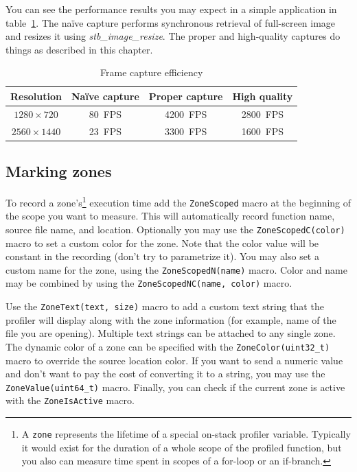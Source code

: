 \documentclass[hidelinks,titlepage,a4paper]{article}
\begin{document}
You can see the performance results you may expect in a simple application in table~\ref{asynccapture}. The na\"ive capture performs synchronous retrieval of full-screen image and resizes it using \emph{stb\_image\_resize}. The proper and high-quality captures do things as described in this chapter.

\begin{table}[h]
\centering
\begin{tabular}[h]{c|c|c|c}
\textbf{Resolution} & \textbf{Na\"ive capture} & \textbf{Proper capture} & \textbf{High quality} \\ \hline
$1280\times720$ & 80~FPS & 4200~FPS & 2800~FPS \\
$2560\times1440$ & 23~FPS & 3300~FPS & 1600~FPS
\end{tabular}
\caption{Frame capture efficiency}
\label{asynccapture}
\end{table}

\subsection{Marking zones}
\label{markingzones}

To record a zone's\footnote{A \texttt{zone} represents the lifetime of a special on-stack profiler variable. Typically it would exist for the duration of a whole scope of the profiled function, but you also can measure time spent in scopes of a for-loop or an if-branch.} execution time add the \texttt{ZoneScoped} macro at the beginning of the scope you want to measure. This will automatically record function name, source file name, and location. Optionally you may use the \texttt{ZoneScopedC(color)} macro to set a custom color for the zone. Note that the color value will be constant in the recording (don't try to parametrize it). You may also set a custom name for the zone, using the \texttt{ZoneScopedN(name)} macro. Color and name may be combined by using the \texttt{ZoneScopedNC(name, color)} macro.

Use the \texttt{ZoneText(text, size)} macro to add a custom text string that the profiler will display along with the zone information (for example, name of the file you are opening). Multiple text strings can be attached to any single zone. The dynamic color of a zone can be specified with the \texttt{ZoneColor(uint32\_t)} macro to override the source location color. If you want to send a numeric value and don't want to pay the cost of converting it to a string, you may use the \texttt{ZoneValue(uint64\_t)} macro. Finally, you can check if the current zone is active with the \texttt{ZoneIsActive} macro.
\end{document}
